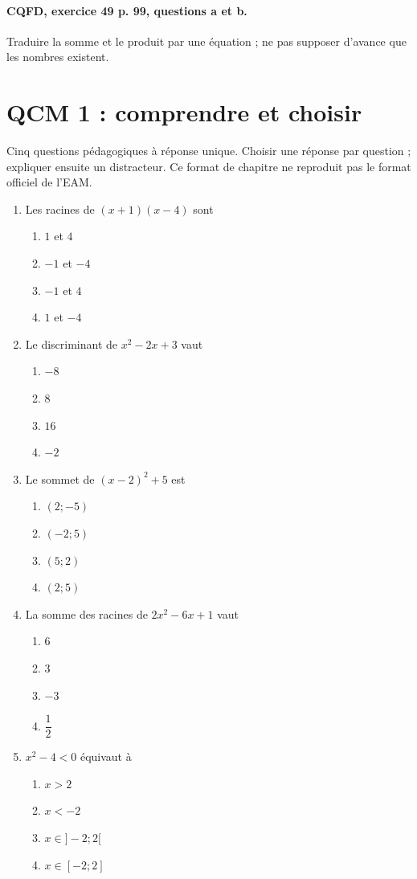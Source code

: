 \paragraph{CQFD, exercice 49 p. 99, questions a et b.}\label{C02-M2} Traduire la somme et le produit par une équation ; ne pas supposer d’avance que les nombres existent.
\begingroup\small
\clearpage\section*{QCM 1 : comprendre et choisir}\label{C02-Q1}
Cinq questions pédagogiques à réponse unique. Choisir une réponse par question ; expliquer ensuite un distracteur. Ce format de chapitre ne reproduit pas le format officiel de l’EAM.
\begin{enumerate}
\item Les racines de $(x+1)(x-4)$ sont
\begin{enumerate}[label=\Alph*.,itemsep=2pt]
\item $1$ et $4$
\item $-1$ et $-4$
\item $-1$ et $4$
\item $1$ et $-4$
\end{enumerate}
\item Le discriminant de $x^2-2x+3$ vaut
\begin{enumerate}[label=\Alph*.,itemsep=2pt]
\item $-8$
\item $8$
\item $16$
\item $-2$
\end{enumerate}
\item Le sommet de $(x-2)^2+5$ est
\begin{enumerate}[label=\Alph*.,itemsep=2pt]
\item $(2;-5)$
\item $(-2;5)$
\item $(5;2)$
\item $(2;5)$
\end{enumerate}
\item La somme des racines de $2x^2-6x+1$ vaut
\begin{enumerate}[label=\Alph*.,itemsep=2pt]
\item $6$
\item $3$
\item $-3$
\item $\dfrac{1}{2}$
\end{enumerate}
\item $x^2-4<0$ équivaut à
\begin{enumerate}[label=\Alph*.,itemsep=2pt]
\item $x>2$
\item $x<-2$
\item $x\in]-2;2[$
\item $x\in[-2;2]$
\end{enumerate}
\end{enumerate}

